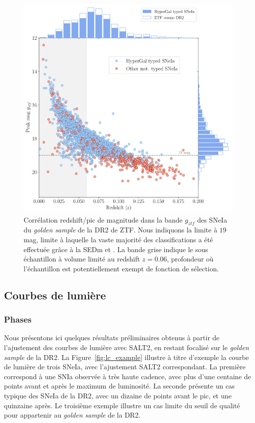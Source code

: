 \documentclass[../main/main.tex]{subfiles}
\begin{document}
\begin{figure}[ht!]
  \centering
  \includegraphics[width=1\textwidth]{../figures/09_dr2/peakvsredshift_dr2.pdf}
  \caption[Corrélation redshift/pic de magnitude $g_{ztf}$) du
  \textit{golden sample} de la DR2 de ZTF.]{Corrélation redshift/pic de
    magnitude dans la bande $g_{ztf}$ des SNeIa du
  \textit{golden sample} de la DR2 de ZTF. Nous indiquons la limite à
  $19$ mag, limite à laquelle la vaste majorité des classifications a
  été effectuée grâce à la SEDm et \hypergal. La bande grise
 indique le sous échantillon à volume limité au redshift $z=0.06$,
 profondeur où l'échantillon est potentiellement exempt de fonction de sélection.}
  \label{fig:peakmagztfg}
\end{figure}

\clearpage
\subsection{Courbes de lumière}

\subsubsection{Phases}
Nous présentons ici quelques résultats préliminaires obtenus à partir de
l'ajustement des courbes de lumière avec SALT2, en restant
focalisé sur le \textit{golden sample} de la DR2. La
Figure~\ref{fig:lc_example} illustre à titre d'exemple la courbe de lumière de trois
SNeIa, avec l'ajustement SALT2 correspondant. La première correspond à
une SNIa observée à très haute cadence, avec plus d'une centaine de
points avant et après le maximum de luminosité. La seconde présente un
cas typique des SNeIa de la DR2, avec un dizaine de points avant le pic,
et une quinzaine après. Le troisième exemple illustre un cas limite du
seuil de qualité pour appartenir au \textit{golden sample} de la DR2.
\end{document}
